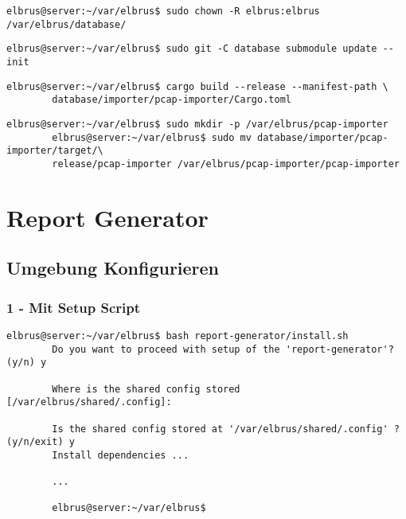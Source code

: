 \documentclass{article}
\begin{document}
	\lstset{style=commands}
	\begin{lstlisting}[caption={Wechseln des Besitzers von Database.}]
		elbrus@server:~/var/elbrus$ sudo chown -R elbrus:elbrus /var/elbrus/database/
	\end{lstlisting}

	\begin{lstlisting}[caption={Updaten der git Submodule.}]
		elbrus@server:~/var/elbrus$ sudo git -C database submodule update --init
	\end{lstlisting}

	\begin{lstlisting}[caption={Kompilieren des 'pcap-importers'.}]
		elbrus@server:~/var/elbrus$ cargo build --release --manifest-path \
		database/importer/pcap-importer/Cargo.toml
	\end{lstlisting}

	\begin{lstlisting}[caption={Kopieren des 'pcap-importers' in ein eigenes Verzeichniss.}]
		elbrus@server:~/var/elbrus$ sudo mkdir -p /var/elbrus/pcap-importer
		elbrus@server:~/var/elbrus$ sudo mv database/importer/pcap-importer/target/\
		release/pcap-importer /var/elbrus/pcap-importer/pcap-importer
	\end{lstlisting}
	\newpage
	
	\section{Report Generator}

	\subsection[file config]{Umgebung Konfigurieren}
	
	\subsubsection{1 - Mit Setup Script}
	
	\begin{lstlisting}[caption={Ausführen des 'install.sh' Scripts.}]
		elbrus@server:~/var/elbrus$ bash report-generator/install.sh
		Do you want to proceed with setup of the 'report-generator'? (y/n) y
		
		Where is the shared config stored [/var/elbrus/shared/.config]:
		
		Is the shared config stored at '/var/elbrus/shared/.config' ? (y/n/exit) y
		Install dependencies ...
		
		...
		
		elbrus@server:~/var/elbrus$
	\end{lstlisting}
\end{document}
